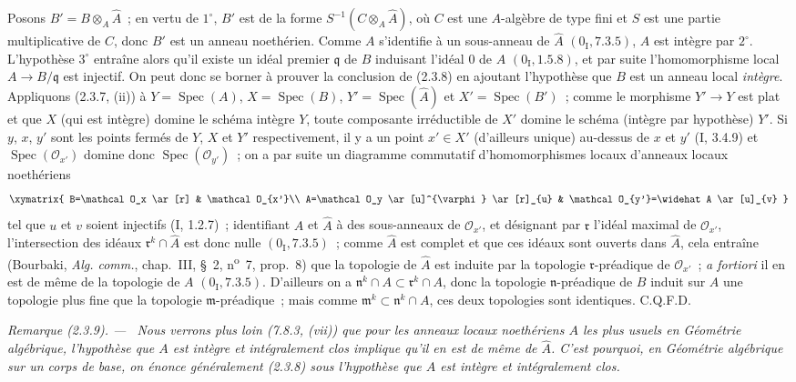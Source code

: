 \documentclass[10pt,oneside]{book}
\newcommand{\oldpage}[2][]{%
  \setcounter{footnote}{0}%
  \marginpar{\scriptsize\textbf{#1}~|~#2}\ignorespaces}
\newenvironment{remark}[1][]{%
  \par\medskip\noindent\itshape Remarque (#1). ---\ }{\par}
\begin{document}
\oldpage[IV-2]{17}
Posons $B'=B\otimes_A\widehat A$~; en vertu de $1^\circ$, $B'$ est de la forme
$S^{-1}(C\otimes_A\widehat A)$, où $C$ est une $A$-algèbre de type fini et
$S$ est une partie multiplicative de $C$, donc $B'$ est un anneau noethérien.
Comme $A$ s'identifie à un sous-anneau de $\widehat A$
$(0_{\mathrm I},7.3.5)$, $A$ est intègre par $2^\circ$. L'hypothèse
$3^\circ$ entraîne alors qu'il existe un idéal premier $\mathfrak q$ de $B$
induisant l'idéal 0 de $A$ $(0_{\mathrm I},1.5.8)$, et par suite
l'homomorphisme local $A\to B/\mathfrak q$ est injectif. On peut donc se borner
à prouver la conclusion de (2.3.8) en ajoutant l'hypothèse que $B$ est un
anneau local \emph{intègre}. Appliquons (2.3.7, (ii)) à
$Y=\operatorname{Spec}(A)$, $X=\operatorname{Spec}(B)$,
$Y'=\operatorname{Spec}(\widehat A)$ et $X'=\operatorname{Spec}(B')$~; comme
le morphisme $Y'\to Y$ est plat et que $X$ (qui est intègre) domine le schéma
intègre $Y$, toute composante irréductible de $X'$ domine le schéma (intègre
par hypothèse) $Y'$. Si $y$, $x$, $y'$ sont les points fermés de $Y$, $X$ et
$Y'$ respectivement, il y a un point $x'\in X'$ (d'ailleurs unique) au-dessus
de $x$ et $y'$ (I, 3.4.9) et $\operatorname{Spec}(\mathcal O_{x'})$ domine
donc $\operatorname{Spec}(\mathcal O_{y'})$~; on a par suite un diagramme
commutatif d'homomorphismes locaux d'anneaux locaux noethériens
\[
\xymatrix{
  B=\mathcal O_x \ar[r] & \mathcal O_{x'}\\
  A=\mathcal O_y \ar[u]^{\varphi} \ar[r]_{u} &
  \mathcal O_{y'}=\widehat A \ar[u]_{v}
}
\]
tel que $u$ et $v$ soient injectifs (I, 1.2.7)~; identifiant $A$ et
$\widehat A$ à des sous-anneaux de $\mathcal O_{x'}$, et désignant par
$\mathfrak r$ l'idéal maximal de $\mathcal O_{x'}$, l'intersection des idéaux
$\mathfrak r^k\cap\widehat A$ est donc nulle $(0_{\mathrm I},7.3.5)$~;
comme $\widehat A$ est complet et que ces idéaux sont ouverts dans
$\widehat A$, cela entraîne (Bourbaki, \emph{Alg. comm.}, chap.~III, \S~2,
n\textsuperscript{o}~7, prop.~8) que la topologie de $\widehat A$ est induite
par la topologie $\mathfrak r$-préadique de $\mathcal O_{x'}$~; \emph{a
fortiori} il en est de même de la topologie de $A$
$(0_{\mathrm I},7.3.5)$. D'ailleurs on a
$\mathfrak n^k\cap A\subset\mathfrak r^k\cap A$, donc la topologie
$\mathfrak n$-préadique de $B$ induit sur $A$ une topologie plus fine que la
topologie $\mathfrak m$-préadique~; mais comme
$\mathfrak m^k\subset\mathfrak n^k\cap A$, ces deux topologies sont
identiques. C.Q.F.D.

\begin{remark}[2.3.9]
\label{IV.2.3.9-fr}
Nous verrons plus loin (7.8.3, (vii)) que pour les anneaux locaux noethériens
$A$ les plus usuels en Géométrie algébrique, l'hypothèse que $A$ est intègre
et intégralement clos implique qu'il en est de même de $\widehat A$. C'est
pourquoi, en Géométrie algébrique sur un corps de base, on énonce généralement
(2.3.8) sous l'hypothèse que $A$ est \emph{intègre et intégralement clos}.
\end{remark}
\end{document}
